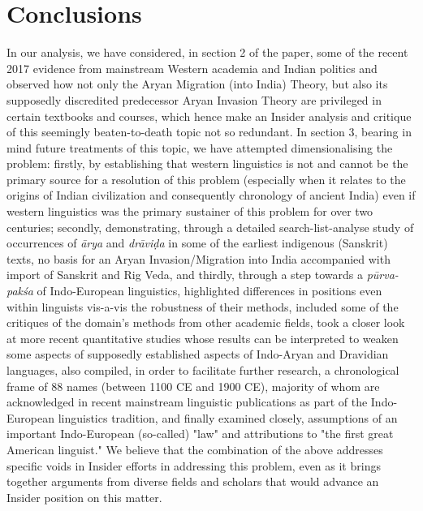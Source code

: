 \section{Conclusions}

In our analysis, we have considered, in section 2 of the paper, some of the recent 2017 evidence from mainstream Western academia and Indian politics and observed how not only the Aryan Migration (into India) Theory, but also its supposedly discredited predecessor Aryan Invasion Theory are privileged in certain textbooks and courses, which hence make an Insider analysis and critique of this seemingly beaten-to-death topic not so redundant. In section 3, bearing in mind future treatments of this topic, we have attempted dimensionalising the problem: firstly, by establishing that western linguistics is not and cannot be the primary source for a resolution of this problem (especially when it relates to the origins of Indian civilization and consequently chronology of ancient India) even if western linguistics was the primary sustainer of this problem for over two centuries; secondly, demonstrating, through a detailed search-list-analyse study of occurrences of \textit{ārya} and \textit{drāviḍa} in some of the earliest indigenous (Sanskrit) texts, no basis for an Aryan Invasion/Migration into India accompanied with import of Sanskrit and Rig Veda, and thirdly, through a step towards a \textit{pūrva-pakśa} of Indo-European linguistics, highlighted differences in positions even within linguists vis-a-vis the robustness of their methods, included some of the critiques of the domain's methods from other academic fields, took a closer look at more recent quantitative studies whose results can be interpreted to weaken some aspects of supposedly established aspects of Indo-Aryan and Dravidian languages, also compiled, in order to facilitate further research, a chronological frame of 88 names (between 1100 CE and 1900 CE), majority of whom are acknowledged in recent mainstream linguistic publications as part of the Indo-European linguistics tradition, and finally examined closely, assumptions of an important Indo-European (so-called) "law" and attributions to "the first great American linguist." We believe that the combination of the above addresses specific voids in Insider efforts in addressing this problem, even as it brings together arguments from diverse fields and scholars that would advance an Insider position on this matter.

\newpage

